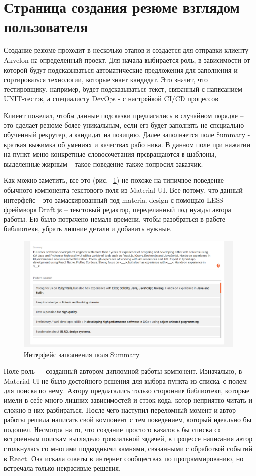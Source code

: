 \documentclass[12pt, a4paper]{diplom}
\begin{document}
\section{Страница создания резюме взглядом пользователя}
Создание резюме проходит в несколько этапов и создается для отправки клиенту Akvelon на определенный проект.
Для начала выбирается роль, в зависимости от которой будут подсказываться автоматические предложения для заполнения и сортироваться технологии, которые знает кандидат. Это значит, что тестировщику, например, будет подсказываться текст,
связанный с написанием UNIT-тестов, а специалисту DevOps - с настройкой CI/CD процессов.

Клиент пожелал, чтобы данные подсказки предлагались в случайном порядке -- это сделает резюме более уникальным, если его будет заполнять не специально обученный рекрутер, а кандидат на позицию.
Далее заполняется поле Summary - краткая выжимка об умениях и качествах работника. В данном поле при нажатии на пункт меню конкретные словосочетания превращаются в шаблоны, выделенные жирным -- такое поведение также попросил заказчик.

Как можно заметить, все это (рис. ~\ref{7}) не похоже на типичное поведение обычного компонента текстового поля из Material UI. Все потому, что данный интерфейс -- это
замаскированный под material design с помощью LESS фреймворк Draft.js -- текстовый редактор, переделанный под нужды автора работы. Ею было потрачено немало времени, чтобы разобраться в работе библиотеки,
убрать лишние детали и добавить нужные.

\begin{figure}[!ht]
\centering
\includegraphics[width=1\textwidth]{resources/summary.png}
\caption{Интерфейс заполнения поля Summary}
\label{7}
\end{figure}

Поле роль — созданный автором дипломной работы компонент. Изначально, в Material UI не было достойного решения для выбора пункта из списка, с полем для поиска по нему.
Автору предлагались только сторонние библиотеки, которые имели в себе много лишних зависимостей и строк кода, котор неприятно читать и сложно в них разбираться.
После чего наступил переломный момент и автор работы решила написать свой компонент с тем поведением, который идеально бы подошел. Несмотря на то, что создание простого казалось бы списка со встроенным поискам выглядело тривиальной задачей,
в процессе написания автор столкнулась со многими подводными камнями, связанными с обработкой событий в React. Она искала ответы в интернет сообществах по программированию,
но встречала только некрасивые решения.
\end{document}
